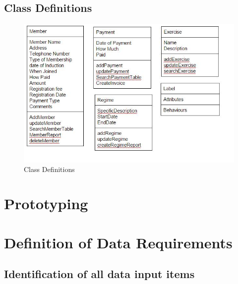 \subsection{Class Definitions}

\begin{figure}[H]
    \includegraphics[width=\textwidth]{NewClassDefs.JPG}
    \caption{Class Definitions} \label{fig:Class Definitions}
\end{figure}

\section{Prototyping}

\section{Definition of Data Requirements}

\subsection{Identification of all data input items}


